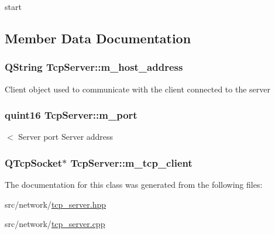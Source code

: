 start 



\subsection{Member Data Documentation}
\subsubsection[{\texorpdfstring{m\+\_\+host\+\_\+address}{m_host_address}}]{\setlength{\rightskip}{0pt plus 5cm}Q\+String Tcp\+Server\+::m\+\_\+host\+\_\+address\hspace{0.3cm}{\ttfamily [private]}}\hypertarget{class_tcp_server_aa8fd2e3eebacb69a7f785ffcc2a69eee}{}\label{class_tcp_server_aa8fd2e3eebacb69a7f785ffcc2a69eee}
Client object used to communicate with the client connected to the server 
\subsubsection[{\texorpdfstring{m\+\_\+port}{m_port}}]{\setlength{\rightskip}{0pt plus 5cm}quint16 Tcp\+Server\+::m\+\_\+port\hspace{0.3cm}{\ttfamily [private]}}\hypertarget{class_tcp_server_a01d5a7bfe29ae6632180be7899d3740f}{}\label{class_tcp_server_a01d5a7bfe29ae6632180be7899d3740f}
$<$ Server port Server address 
\subsubsection[{\texorpdfstring{m\+\_\+tcp\+\_\+client}{m_tcp_client}}]{\setlength{\rightskip}{0pt plus 5cm}Q\+Tcp\+Socket$\ast$ Tcp\+Server\+::m\+\_\+tcp\+\_\+client\hspace{0.3cm}{\ttfamily [private]}}\hypertarget{class_tcp_server_a34a159e3301900eac7bf08346fc3615b}{}\label{class_tcp_server_a34a159e3301900eac7bf08346fc3615b}


The documentation for this class was generated from the following files\+:\begin{DoxyCompactItemize}
\item 
src/network/\hyperlink{tcp__server_8hpp}{tcp\+\_\+server.\+hpp}\item 
src/network/\hyperlink{tcp__server_8cpp}{tcp\+\_\+server.\+cpp}\end{DoxyCompactItemize}
